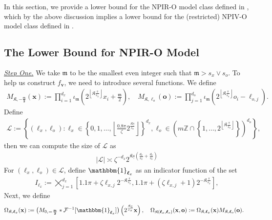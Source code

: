 \documentclass[11pt]{article}
\newcommand{\one}{\mathbbm{1}}
\newcommand{\bx}{\mathbf x}
\newcommand{\bv}{\mathbf v}
\newcommand{\bo}{\mathbf o}
\newcommand{\calF}{\mathcal{F}}
\newcommand{\calL}{\mathcal{L}}
\newcommand{\bl}{{\boldsymbol\ell}}
\newcommand{\0}{\mathbf{0}}
\begin{document}
\begin{appendix}
In this section, we provide a lower bound for the NPIR-O model class defined in , which by the above discussion implies a lower bound for the (restricted) NPIV-O model class defined in .

\subsection{The Lower Bound for NPIR-O Model}
\label{sec:NPIR_lower_appendix}

\underline{\emph{Step One.}}
We take $\mathfrak{m}$ to be the smallest even integer such that $\mathfrak{m} > s_x \vee s_o$.
To help us construct $f_{\bv}$, we need to introduce several functions.
We define
\begin{align}
\label{eq:Bspline_main}
    M_{\mathfrak{K}, \boldsymbol{-\frac{\mathfrak{m}}{2}}}(\bx) := \prod_{i=1}^{d_x}\iota_\mathfrak{m}\left(2^{\left\lfloor \mathfrak{K}\frac{\underline{s}}{s_x}\right\rfloor}x_i + \frac{\mathfrak{m}}{2} \right), \quad M_{\mathfrak{K},\bl_o}(\bo) := \prod_{j=1}^{d_o}\iota_\mathfrak{m}\left(2^{\left\lfloor \mathfrak{K}\frac{\underline{s}}{s_o}\right\rfloor}o_i - \ell_{o,j}\right).
\end{align}
Define
\begin{align}\label{eq:calL}
    \mathcal{L} := \left\{(\bl_x,\bl_o): \bl_x \in \left\{0,1,\dots, \left\lfloor \frac{0.8\pi}{\zeta}2^{\frac{\mathfrak{K}\underline{s}}{s_x}}\right\rfloor\right\}^{d_x},  \bl_o \in \left(m\mathbb{Z}\cap \left\{1, \dots, 2^{\left\lfloor \mathfrak{K}\frac{\underline{s}}{s_o}\right\rfloor}\right\}\right)^{d_o}\right\},
\end{align}
then we can compute the size of $\calL$ as 
\begin{align}\label{eq:size_L}
    |\calL| \asymp \zeta^{-d_x}2^{\mathfrak{K}\underline{s}\left(\frac{d_x}{s_x} + \frac{d_o}{s_o}\right)}
\end{align}
For $(\bl_x, \bl_o) \in \calL$, define $\one_{\bl_x}$ as an indicator function of the set
\begin{align}
\label{eq:I_bl_x_defi}
    I_{\bl_x} := \bigtimes_{j=1}^{d_x}\left[1.1\pi + \zeta \ell_{x,j}2^{-\mathfrak{K}\frac{\underline{s}}{s_x}}, 1.1\pi + (\zeta \ell_{x,j} + 1)2^{-\mathfrak{K}\frac{\underline{s}}{s_x}}\right],
\end{align}
Next, we define
\begin{align}
\label{eq:app_omega_klx_defi}
    \Omega_{\mathfrak{K},\bl_x}(\bx) := \left(M_{0,\boldsymbol{-\frac{\mathfrak{m}}{2}}} \ast \calF^{-1}[\one_{\bl_x}]\right)\left(2^{\frac{\mathfrak{K}\underline{s}}{s_x}}\bx\right), \quad \Omega_{\mathfrak{K}(\bl_x,\bl_o)}(\bx,\bo) &:= \Omega_{\mathfrak{K},\bl_x}(\bx)M_{\mathfrak{K},\bl_o}(\bo). 

\end{align}
\end{appendix}
\end{document}
